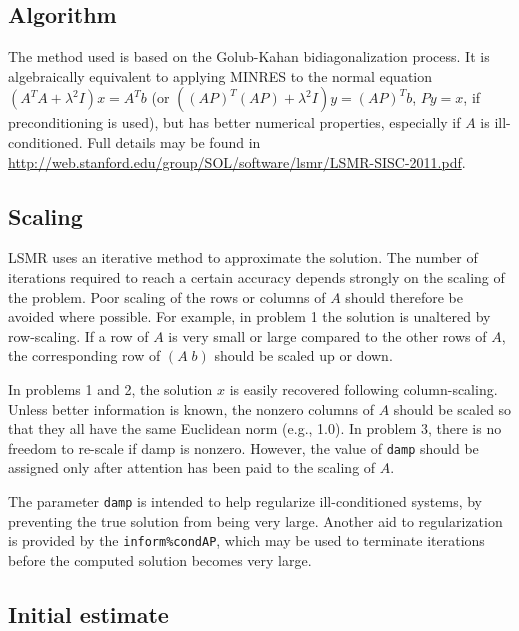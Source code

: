 \subsection{Algorithm}
The method used is based on the Golub-Kahan bidiagonalization process. 
It is algebraically equivalent to applying MINRES to the normal 
equation $(A^TA+\lambda^2I)x=A^Tb$ (or $((AP)^T(AP)+\lambda^2I)y=(AP)^Tb$,
$Py = x$,
if preconditioning is used), but has better numerical properties, 
especially if $A$ is ill-conditioned. 
Full details may be found in
{\url{
http://web.stanford.edu/group/SOL/software/lsmr/LSMR-SISC-2011.pdf}}.

\subsection{Scaling}
     LSMR uses an iterative method to approximate the solution.
     The number of iterations required to reach a certain accuracy
     depends strongly on the scaling of the problem.  Poor scaling of
     the rows or columns of $A $ should therefore be avoided where
     possible. For example, in problem 1 the solution is unaltered by
     row-scaling.  If a row of $A$ is very small or large compared to
     the other rows of $A$, the corresponding row of $ ( A\;  b )$ should be
     scaled up or down.
    
     In problems 1 and 2, the solution $x$ is easily recovered
     following column-scaling.  Unless better information is known,
     the nonzero columns of $A$ should be scaled so that they all have
     the same Euclidean norm (e.g., 1.0).
     In problem 3, there is no freedom to re-scale if damp is
     nonzero.  However, the value of {\tt damp} should be assigned only
     after attention has been paid to the scaling of $A$.
    
     The parameter {\tt damp} is intended to help regularize
     ill-conditioned systems, by preventing the true solution from
     being very large.  Another aid to regularization is provided by
     the {\tt inform\%condAP}, which may be used to terminate iterations
     before the computed solution becomes very large.

\subsection{Initial estimate}
    
